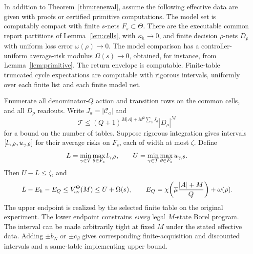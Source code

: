 \begin{theorem}\label{thm:compile}
In addition to Theorem~\ref{thm:renewal}, assume the following effective data are given with proofs or certified primitive computations. The model set is computably compact with finite $s$-nets $F_s\subset\Theta$. There are the executable common report partitions of Lemma~\ref{lem:cells}, with $\kappa_h\to0$, and finite decision $\rho$-nets $D_\rho$ with uniform loss error $\omega(\rho)\to0$. The model comparison has a controller-uniform average-risk modulus $\Omega(s)\to0$, obtained, for instance, from Lemma~\ref{lem:primitive}. The return envelope is computable. Finite-table truncated cycle expectations are computable with rigorous intervals, uniformly over each finite list and each finite model net.

Enumerate all denominator-$Q$ action and transition rows on the common cells, and all $D_\rho$ readouts. Write $J_a=|\mathcal C_a|$ and
\begin{equation}\label{eq:count}
 \mathcal T\le
 (Q+1)^{M|A|+M^2\sum_aJ_a}|D_\rho|^M
\end{equation}
for a bound on the number of tables. Suppose rigorous integration gives intervals $[l_{\gamma,\theta},u_{\gamma,\theta}]$ for their average risks on $F_s$, each of width at most $\zeta$. Define
\[
 L=\min_{\gamma\in\mathcal T}\max_{\theta\in F_s}l_{\gamma,\theta},\qquad
 U=\min_{\gamma\in\mathcal T}\max_{\theta\in F_s}u_{\gamma,\theta}.
\]
Then $U-L\le\zeta$, and
\begin{equation}\label{eq:certificate}
 L-E_h-E_Q\le V_{\mathrm{av}}^\Theta(M)\le U+\Omega(s),\qquad
 E_Q=\chi\!\left(\overline\mu\frac{|A|+M}{Q}\right)+\omega(\rho).
\end{equation}
The upper endpoint is realized by the selected finite table on the original experiment. The lower endpoint constrains \emph{every} legal $M$-state Borel program. The interval can be made arbitrarily tight at fixed $M$ under the stated effective data. Adding $\pm b_N$ or $\pm c_\beta$ gives corresponding finite-acquisition and discounted intervals and a same-table implementing upper bound.
\end{theorem}
